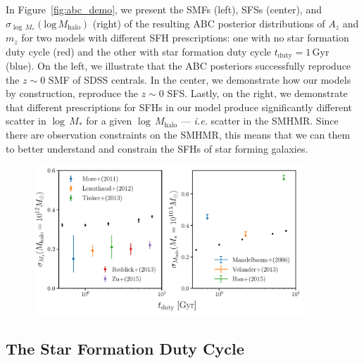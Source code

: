 \documentclass[12pt, letterpaper, preprint]{aastex}
\begin{document}
In Figure~\ref{fig:abc_demo}, we present the SMFs (left), SFSs (center), and 
$\sigma_{\log\,M_*}(\mathrm{log}\,M_\mathrm{halo})$ (right) of the resulting
ABC posterior distributions of $A_z$ and $m_z$ for two models with different 
SFH prescriptions: one with no star formation duty cycle (red) and the other 
with star formation duty cycle $t_\mathrm{duty} = 1\,\mathrm{Gyr}$ (blue). 
On the left, we illustrate that the ABC posteriors successfully reproduce
the $z \sim 0$ SMF of SDSS centrals. In the center, we demonstrate how our 
models by construction, reproduce the $z\sim0$ SFS. Lastly, on the right, 
we demonstrate that different prescriptions for SFHs in our model produce significantly
different scatter in $\log\,M_*$ for a given $\log\,M_\mathrm{halo}$ --- 
\emph{i.e.} scatter in the SMHMR. Since there are observation constraints on 
the SMHMR, this means that we can them to better understand and constrain 
the SFHs of star forming galaxies. 

\begin{figure}
\begin{center}
\includegraphics[width=0.9\textwidth]{figs/SHMRscatter_tduty.pdf}
\caption{}
\label{fig:sigMstar_duty}
\end{center}
\end{figure}

\subsection{The Star Formation Duty Cycle}
\end{document}
